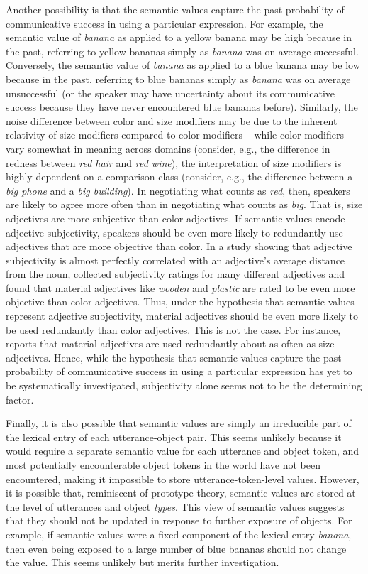 \documentclass[11pt]{article}
\begin{document}
Another possibility is that the semantic values capture the past probability of communicative success in using a particular expression. For example, the semantic value of \emph{banana} as applied to a yellow banana may be high because in the past, referring to yellow bananas simply as \emph{banana} was on average successful. Conversely,  the semantic value of \emph{banana} as applied to a blue banana may be low because in the past, referring to blue bananas simply as \emph{banana} was on average unsuccessful (or the speaker may have uncertainty about its communicative success because they have never encountered blue bananas before). Similarly, the noise difference between color and size modifiers may be due to the inherent relativity of size modifiers compared to color modifiers -- while color modifiers vary somewhat in meaning across domains (consider, e.g., the difference in redness between \emph{red hair} and \emph{red wine}), the interpretation of size modifiers is highly dependent on a comparison class (consider, e.g., the difference between a \emph{big phone} and a \emph{big building}). In negotiating what counts as \emph{red}, then, speakers are likely to agree more often than in negotiating what counts as \emph{big}.  That is, size adjectives are more subjective than color adjectives. If semantic values encode adjective subjectivity, speakers should be even more likely to redundantly use adjectives that are more objective than color. In a study showing that adjective subjectivity is almost perfectly correlated with an adjective's average distance from the noun,  collected subjectivity ratings for many different adjectives and found that material adjectives like \emph{wooden} and \emph{plastic} are rated to be even more objective than color adjectives. Thus, under the hypothesis that semantic values represent adjective subjectivity, material adjectives should be even more likely to be used redundantly than color adjectives. This is not the case. For instance,  reports that material adjectives are used redundantly about as often as size adjectives. Hence, while the hypothesis that semantic values capture the past probability of communicative success in using a particular expression has yet to be systematically investigated, subjectivity alone seems not to be the determining factor.

Finally, it is also possible that semantic values are simply an irreducible part of the lexical entry of each utterance-object pair. This seems unlikely because it would require a separate semantic value for each utterance and object token, and most potentially encounterable object tokens in the world have not been encountered, making it impossible to store utterance-token-level values. However, it is possible that, reminiscent of prototype theory, semantic values are stored at the level of utterances and object \emph{types}. This view of semantic values  suggests that they should not be updated in response to further exposure of objects. For example, if semantic values were a fixed component of the lexical entry \emph{banana}, then even being exposed to a large number of blue bananas should not change the value. This seems unlikely but merits further investigation.
\end{document}

